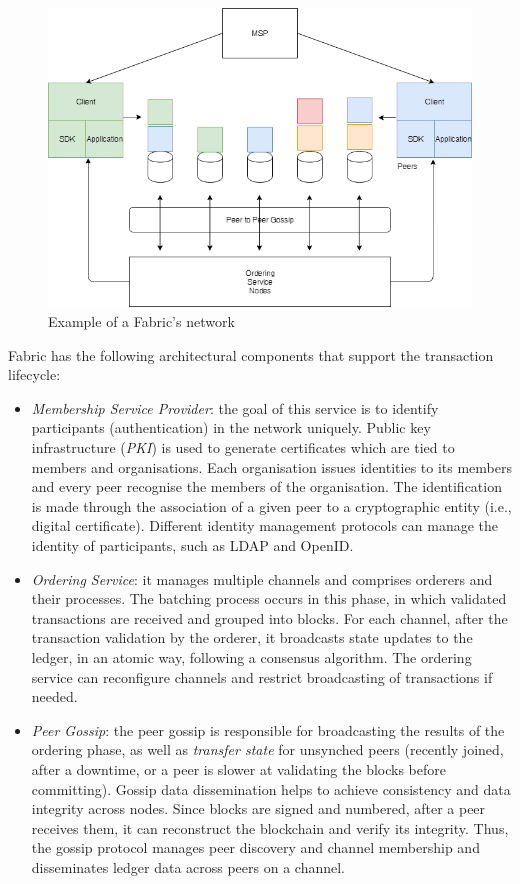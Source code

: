 \documentclass[12pt,a4paper]{article}
\theoremstyle{definition}
\begin{document}
\begin{figure}[ht]

    \includegraphics[scale=.5]{figures/back_fabric_example_network.png}
    \centering
    \caption{Example of a Fabric's network}
    \label{fig: Fabric's example network}
\end{figure}

Fabric has the following architectural components that support the transaction lifecycle:
\begin{itemize}
    \item \emph{Membership Service Provider}: the goal of this service is to identify participants (authentication) in the network uniquely. Public key infrastructure (\textit{PKI}) is used to generate certificates which are tied to members and organisations. Each organisation issues identities to its members and every peer recognise the members of the organisation. The identification is made through the association of a given peer to a cryptographic entity (i.e., digital certificate). Different identity management protocols can manage the identity of participants, such as LDAP and OpenID.
    \item \emph{Ordering Service}: it manages multiple channels and comprises orderers and their processes. The batching process occurs in this phase, in which validated transactions are received and grouped into blocks. For each channel, after the transaction validation by the orderer, it broadcasts state updates to the ledger, in an atomic way, following a consensus algorithm. The ordering service can reconfigure channels and restrict broadcasting of transactions if needed. 
    \item \emph{Peer Gossip}: the peer gossip is responsible for broadcasting the results of the ordering phase, as well as \textit{transfer state} for unsynched peers (recently joined, after a downtime, or a peer is slower at validating the blocks before committing). Gossip data dissemination helps to achieve consistency and data integrity across nodes. Since blocks are signed and numbered, after a peer receives them, it can reconstruct the blockchain and verify its integrity. Thus, the gossip protocol manages peer discovery and channel membership and disseminates ledger data across peers on a channel. 

\end{itemize}
\end{document}

